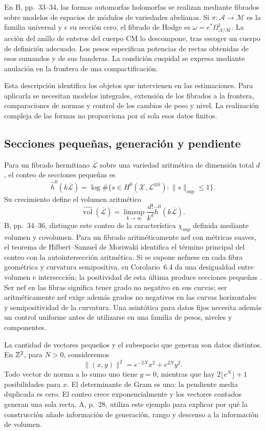 En B, pp.~33--34, las formas automorfas holomorfas se realizan mediante
fibrados sobre modelos de espacios de módulos de variedades abelianas.
Si $\pi:\mathcal A\to\mathcal M$ es la familia universal y $e$ su
sección cero, el fibrado de Hodge es
$\omega=e^*\Omega^1_{\mathcal A/\mathcal M}$.
La acción del anillo de enteros del cuerpo CM lo descompone, tras
escoger un cuerpo de definición adecuado. Los pesos especifican
potencias de rectas obtenidas de esos sumandos y de sus banderas.
La condición cuspidal se expresa mediante anulación en la frontera
de una compactificación.

Esta descripción identifica los objetos que intervienen en las
estimaciones. Para aplicarla se necesitan modelos integrales,
extensión de los fibrados a la frontera, comparaciones de normas
y control de los cambios de peso y nivel. La realización compleja
de las formas no proporciona por sí sola esos datos finitos.

\subsection{Secciones pequeñas, generación y pendiente}

Para un fibrado hermitiano $\overline{\mathcal L}$ sobre una variedad
aritmética de dimensión total $d$, el conteo de secciones pequeñas es
\[
 \widehat h^0(k\overline{\mathcal L})
 =\log\#\{s\in H^0(\mathcal X,\mathcal L^{\otimes k}):
                       \|s\|_{\sup}\le1\}.
\]
Su crecimiento define el volumen aritmético
\[
 \widehat{\operatorname{vol}}(\overline{\mathcal L})
 =\limsup_{k\to\infty}\frac{d!}{k^d}
                  \widehat h^0(k\overline{\mathcal L}).
\]
B, pp.~34--36, distingue este conteo de la característica
$\chi_{\sup}$ definida mediante volumen y covolumen. Para un fibrado
aritméticamente nef con métricas suaves, el teorema de Hilbert--Samuel de
Moriwaki identifica el término principal del conteo con la
autointersección aritmética. Si se supone nefness en cada fibra
geométrica y curvatura semipositiva, su Corolario~6.4 da una
desigualdad entre volumen e intersección; la positividad de esta
última produce secciones pequeñas \cite{moriwaki-volumen}.
Ser nef en las fibras significa tener grado no negativo en sus
curvas; ser aritméticamente nef exige además grados no negativos
en las curvas horizontales y semipositividad de la curvatura.
Una asintótica para datos fijos necesita además un control uniforme
antes de utilizarse en una familia de pesos, niveles y componentes.

La cantidad de vectores pequeños y el subespacio que generan
son datos distintos. En $\mathbb{Z}^2$, para $N>0$, consideremos
\begin{equation}
 \|(x,y)\|^2=e^{-2N}x^2+e^{2N}y^2.
 \label{eq:geom-secciones-ejemplo}
\end{equation}
Todo vector de norma a lo sumo uno tiene $y=0$, mientras que hay
$2\lfloor e^N\rfloor+1$ posibilidades para $x$.
El determinante de Gram es uno: la pendiente media duplicada
es cero. El conteo crece exponencialmente y los vectores contados
generan una sola recta. A, p.~28, utiliza este ejemplo para
explicar por qué la construcción añade información de generación,
rango y descenso a la información de volumen.

